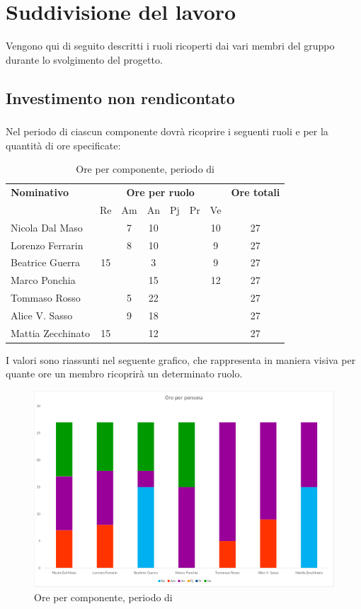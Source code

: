 \section{Suddivisione del lavoro}
Vengono qui di seguito descritti i ruoli ricoperti dai vari membri del gruppo durante lo svolgimento del progetto.
\subsection{Investimento non rendicontato}
\subsubsection{\AR}
Nel periodo di \AR{} ciascun componente dovrà ricoprire i seguenti ruoli e per la quantità di ore specificate:

\begin{table}[H]
	\centering
	\begin{tabular}{|l|c|c|c|c|c|c|c|}
		\hline
		\textbf{Nominativo} & 
		\multicolumn{6}{c|}{\textbf{Ore per ruolo}} & 
		\textbf{Ore totali} \\
		& Re & Am & An & Pj & Pr & Ve & \\
		\hline
		Nicola Dal Maso & & 7 & 10 & & & 10 & 27 \\
		Lorenzo Ferrarin & & 8 & 10 & & & 9 & 27 \\
		Beatrice Guerra & 15 & & 3 & & & 9 & 27 \\
		Marco Ponchia & & & 15 & & & 12 & 27 \\
		Tommaso Rosso & & 5 & 22 & & & & 27 \\
		Alice V. Sasso & & 9 & 18 & & & & 27 \\
		Mattia Zecchinato & 15 & & 12 & & & & 27 \\
		\hline
	\end{tabular}
	\caption{Ore per componente, periodo di \AR{}}
\end{table}
I valori sono riassunti nel seguente grafico, che rappresenta in maniera visiva per quante ore un membro ricoprirà un determinato ruolo.
\begin{figure}[H]
	\centering
	\includegraphics[width=14cm]{img_suddlavoro/AA.png}
	\caption{Ore per componente, periodo di \AR{}}
\end{figure}

